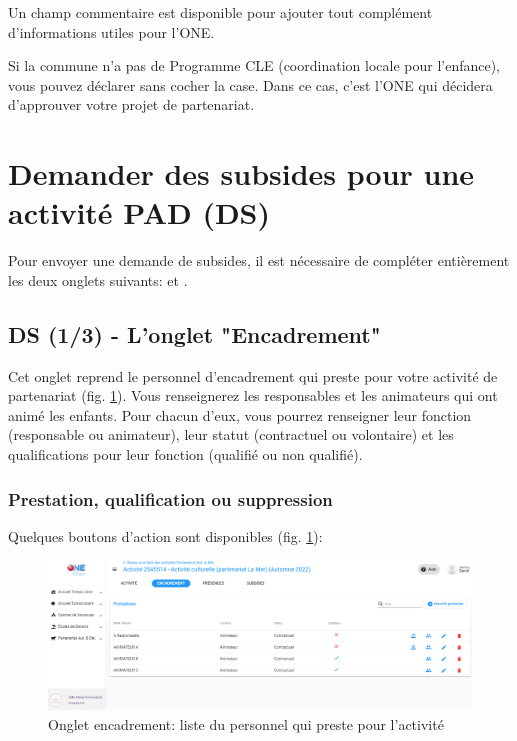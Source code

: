 Un champ commentaire est disponible pour ajouter tout complément d'informations utiles pour l'ONE.


\begin{remarque} %
Si la commune n'a pas de Programme CLE (coordination locale pour l'enfance), vous pouvez déclarer sans cocher la case. Dans ce cas, c'est l'ONE qui décidera d'approuver votre projet de partenariat.
\end{remarque}

\section{Demander des subsides pour une activité PAD (DS)}

Pour envoyer une demande de subsides, il est nécessaire de compléter entièrement les deux onglets suivants:  et .


\subsection{DS (1/3) - L'onglet "Encadrement"}\label{encadrementpad}



Cet onglet reprend le personnel d'encadrement qui preste pour votre activité de partenariat (fig. \ref{fig:pad_encadrement}). Vous renseignerez les responsables et les animateurs qui ont animé les enfants. Pour chacun d'eux, vous pourrez renseigner leur fonction (responsable ou animateur), leur statut (contractuel ou volontaire) et les qualifications pour leur fonction (qualifié ou non qualifié).

\subsubsection{Prestation, qualification ou suppression}
Quelques boutons d'action sont disponibles (fig. \ref{fig:pad_encadrement}):

\begin{figure}[h!]
    \centering
    \includegraphics[width=15cm]{Images/pad/onglet-encadrement.png}
    \caption{Onglet encadrement: liste du personnel qui preste pour l'activité}
    \label{fig:pad_encadrement}
\end{figure}

